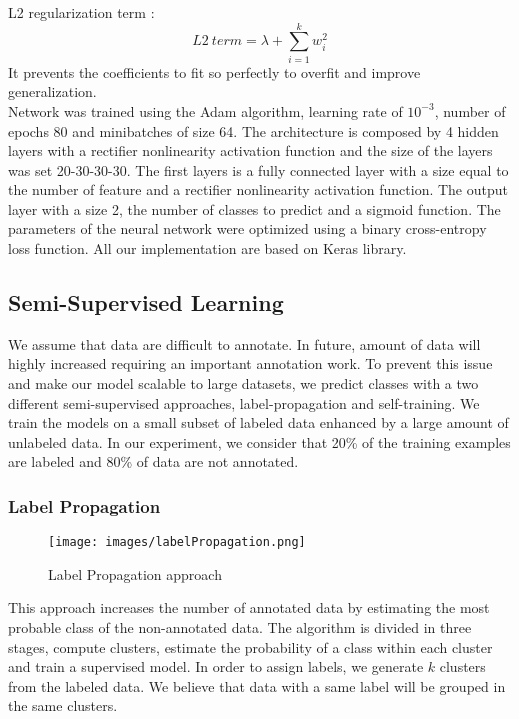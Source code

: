 \documentclass{llncs}
\begin{document}
L2 regularization term :
\begin{equation}
L2\ term = \lambda + \sum\limits_{i=1}^k w_{i}^{2}
\end{equation}
It prevents the coefficients to fit so perfectly to overfit and improve generalization.
\\Network was trained using the Adam algorithm, learning rate of $10^{-3}$, number of epochs 80 and minibatches of size 64. The architecture is composed by 4 hidden layers with a rectifier nonlinearity activation function and the size of the layers was set 20-30-30-30. The first layers is a fully connected layer with a size equal to the number of feature and a rectifier nonlinearity activation function. The output layer with a size 2, the number of classes to predict and a sigmoid function.
The parameters of the neural network were optimized using a binary cross-entropy loss function.
All our implementation are based on Keras library.


\subsection{Semi-Supervised Learning}
We assume that data are difficult to annotate. In future, amount of data will highly increased requiring an important annotation work. To prevent this issue and make our model scalable to large datasets, we predict classes with a two different semi-supervised approaches, label-propagation and self-training.
We train the models on a small subset of labeled data enhanced by a large amount of unlabeled data. In our experiment, we consider that 20\% of the training examples are labeled and 80\% of data are not annotated. 

\subsubsection{Label Propagation}

\begin{figure}[tb]
\centering
\texttt{[image: images/labelPropagation.png]}
\caption{Label Propagation approach}
\label{fig:label-propagation}
\end{figure}


This approach increases the number of annotated data by estimating the most probable class of the non-annotated data. 
The algorithm is divided in three stages, compute clusters, estimate the probability of a class within each cluster and train a supervised model. 
In order to assign labels, we generate $k$ clusters from the labeled data. We believe that data with a same label will be grouped in the same clusters.
\end{document}
